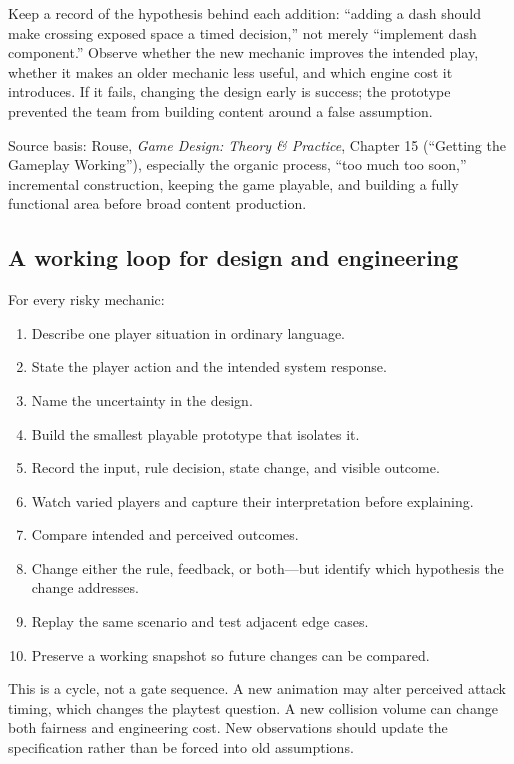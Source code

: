 Keep a record of the hypothesis behind each addition: ``adding a dash should make crossing exposed space a timed decision,'' not merely ``implement dash component.'' Observe whether the new mechanic improves the intended play, whether it makes an older mechanic less useful, and which engine cost it introduces. If it fails, changing the design early is success; the prototype prevented the team from building content around a false assumption.

Source basis: Rouse, \emph{Game Design: Theory \& Practice}, Chapter 15 (``Getting the Gameplay Working''), especially the organic process, ``too much too soon,'' incremental construction, keeping the game playable, and building a fully functional area before broad content production.

\subsection{A working loop for design and engineering}\label{06-engine-ii-ch041-a-working-loop-for-design-and-engineering}

\hypertarget{06-engine-ii-ch041-a-working-loop-for-design-and-engineering}{}

For every risky mechanic:

\begin{enumerate}
\def\labelenumi{\arabic{enumi}.}
\tightlist
\item
  Describe one player situation in ordinary language.
\item
  State the player action and the intended system response.
\item
  Name the uncertainty in the design.
\item
  Build the smallest playable prototype that isolates it.
\item
  Record the input, rule decision, state change, and visible outcome.
\item
  Watch varied players and capture their interpretation before explaining.
\item
  Compare intended and perceived outcomes.
\item
  Change either the rule, feedback, or both---but identify which hypothesis the change addresses.
\item
  Replay the same scenario and test adjacent edge cases.
\item
  Preserve a working snapshot so future changes can be compared.
\end{enumerate}

This is a cycle, not a gate sequence. A new animation may alter perceived attack timing, which changes the playtest question. A new collision volume can change both fairness and engineering cost. New observations should update the specification rather than be forced into old assumptions.

